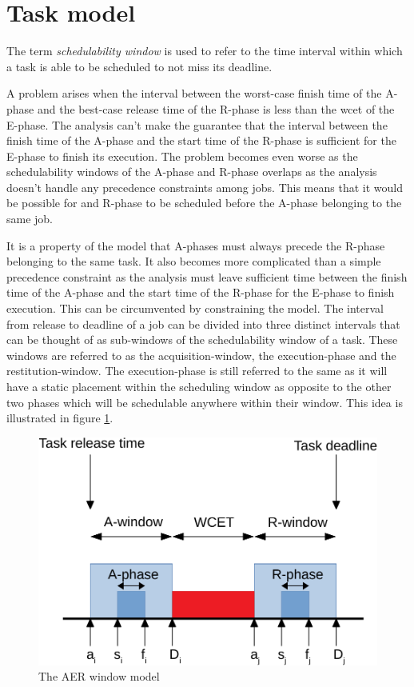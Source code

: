 \documentclass{kththesis}
\begin{document}
\section{Task model} \label{sec:work_task_model}

The term \textit{schedulability window} is used to refer to the time interval within which a task is
able to be scheduled to not miss its deadline. 

A problem arises when the interval between the worst-case finish time of the A-phase and the
best-case release time of the R-phase is less than the \acrshort{wcet} of the E-phase. The analysis
can't make the guarantee that the interval between the finish time of the A-phase and the start time
of the R-phase is sufficient for the E-phase to finish its execution. The problem becomes even worse
as the schedulability windows of the A-phase and R-phase overlaps as the analysis doesn't handle any
precedence constraints among jobs. This means that it would be possible for and R-phase to be
scheduled before the A-phase belonging to the same job.

It is a property of the model that A-phases must always precede the R-phase belonging to the same
task. It also becomes more complicated than a simple precedence constraint as the analysis must
leave sufficient time between the finish time of the A-phase and the start time of the R-phase for
the E-phase to finish execution. This can be circumvented by constraining the model. The interval
from release to deadline of a job can be divided into three distinct intervals that can be thought of
as sub-windows of the schedulability window of a task. These windows are referred to as the
acquisition-window, the execution-phase and the restitution-window. The execution-phase is still
referred to the same as it will have a static placement within the scheduling window as opposite to
the other two phases which will be schedulable anywhere within their window. This idea is
illustrated in figure \ref{fig:aer_window_model}.


\begin{figure}

    \centering

    \includegraphics[width=0.8\linewidth]{images/aer_window_model.pdf}

    \caption{The AER window model}

    \label{fig:aer_window_model}

\end{figure}
\end{document}
